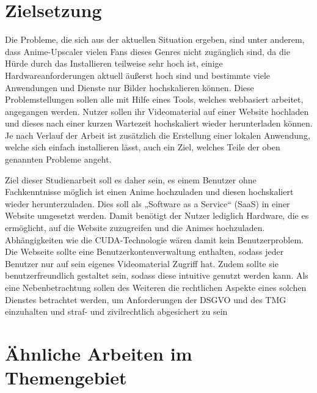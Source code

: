 \begin{onehalfspace}
\section{Zielsetzung}

Die Probleme, die sich aus der aktuellen Situation ergeben, sind unter anderem, dass Anime-Upscaler vielen Fans dieses Genres nicht zugänglich sind, da die Hürde durch das Installieren teilweise sehr hoch ist, einige Hardwareanforderungen aktuell äußerst hoch sind und bestimmte viele Anwendungen und Dienste nur Bilder hochskalieren können. Diese Problemstellungen sollen alle mit Hilfe eines Tools, welches webbasiert arbeitet, angegangen werden. Nutzer sollen ihr Videomaterial auf einer Website hochladen und dieses nach einer kurzen Wartezeit hochskaliert wieder herunterladen können. Je nach Verlauf der Arbeit ist zusätzlich die Erstellung einer lokalen Anwendung, welche sich einfach installieren lässt, auch ein Ziel, welches Teile der oben genannten Probleme angeht.

Ziel dieser Studienarbeit soll es daher sein, es einem Benutzer ohne Fachkenntnisse möglich ist einen Anime hochzuladen und diesen hochskaliert wieder herunterzuladen. Dies soll als „Software as a Service“ (SaaS) in einer Website umgesetzt werden. Damit benötigt der Nutzer lediglich Hardware, die es ermöglicht, auf die Website zuzugreifen und die Animes hochzuladen. Abhängigkeiten wie die CUDA-Technologie wären damit kein Benutzerproblem. Die Webseite sollte eine Benutzerkontenverwaltung enthalten, sodass jeder Benutzer nur auf sein eigenes Videomaterial Zugriff hat. Zudem sollte sie benutzerfreundlich gestaltet sein, sodass diese intuitive genutzt werden kann. Als eine Nebenbetrachtung sollen des Weiteren die rechtlichen Aspekte eines solchen Dienstes betrachtet werden, um Anforderungen der DSGVO und des TMG einzuhalten und straf- und zivilrechtlich abgesichert zu sein

\section{Ähnliche Arbeiten im Themengebiet}


\end{onehalfspace}

